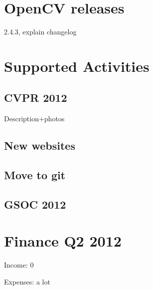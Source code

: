 \documentclass[a4paper,10pt]{article}
\begin{document}
\section*{OpenCV releases}
2.4.3, explain changelog
 
\section*{Supported Activities}

\subsection*{CVPR 2012}

Description+photos

\subsection*{New websites}

\subsection*{Move to git}

\subsection*{GSOC 2012}

\section*{Finance Q2 2012}

Income: 0

Expenses: a lot
\end{document}
